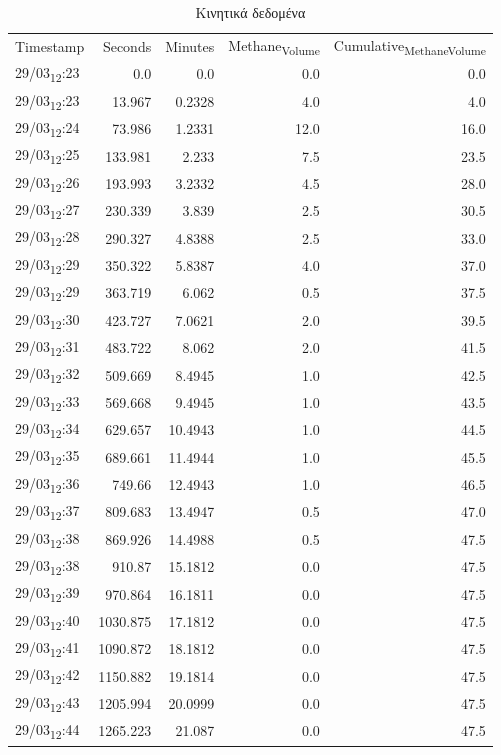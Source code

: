 \documentclass[11pt]{article}
\begin{document}
\begin{table}[htbp]
\caption{Κινητικά δεδομένα}
\centering
\begin{tabular}{lrrrr}
Timestamp & Seconds & Minutes & Methane\textsubscript{Volume} & Cumulative\textsubscript{Methane}\textsubscript{Volume}\\[0pt]
29/03\textsubscript{12}:23 & 0.0 & 0.0 & 0.0 & 0.0\\[0pt]
29/03\textsubscript{12}:23 & 13.967 & 0.2328 & 4.0 & 4.0\\[0pt]
29/03\textsubscript{12}:24 & 73.986 & 1.2331 & 12.0 & 16.0\\[0pt]
29/03\textsubscript{12}:25 & 133.981 & 2.233 & 7.5 & 23.5\\[0pt]
29/03\textsubscript{12}:26 & 193.993 & 3.2332 & 4.5 & 28.0\\[0pt]
29/03\textsubscript{12}:27 & 230.339 & 3.839 & 2.5 & 30.5\\[0pt]
29/03\textsubscript{12}:28 & 290.327 & 4.8388 & 2.5 & 33.0\\[0pt]
29/03\textsubscript{12}:29 & 350.322 & 5.8387 & 4.0 & 37.0\\[0pt]
29/03\textsubscript{12}:29 & 363.719 & 6.062 & 0.5 & 37.5\\[0pt]
29/03\textsubscript{12}:30 & 423.727 & 7.0621 & 2.0 & 39.5\\[0pt]
29/03\textsubscript{12}:31 & 483.722 & 8.062 & 2.0 & 41.5\\[0pt]
29/03\textsubscript{12}:32 & 509.669 & 8.4945 & 1.0 & 42.5\\[0pt]
29/03\textsubscript{12}:33 & 569.668 & 9.4945 & 1.0 & 43.5\\[0pt]
29/03\textsubscript{12}:34 & 629.657 & 10.4943 & 1.0 & 44.5\\[0pt]
29/03\textsubscript{12}:35 & 689.661 & 11.4944 & 1.0 & 45.5\\[0pt]
29/03\textsubscript{12}:36 & 749.66 & 12.4943 & 1.0 & 46.5\\[0pt]
29/03\textsubscript{12}:37 & 809.683 & 13.4947 & 0.5 & 47.0\\[0pt]
29/03\textsubscript{12}:38 & 869.926 & 14.4988 & 0.5 & 47.5\\[0pt]
29/03\textsubscript{12}:38 & 910.87 & 15.1812 & 0.0 & 47.5\\[0pt]
29/03\textsubscript{12}:39 & 970.864 & 16.1811 & 0.0 & 47.5\\[0pt]
29/03\textsubscript{12}:40 & 1030.875 & 17.1812 & 0.0 & 47.5\\[0pt]
29/03\textsubscript{12}:41 & 1090.872 & 18.1812 & 0.0 & 47.5\\[0pt]
29/03\textsubscript{12}:42 & 1150.882 & 19.1814 & 0.0 & 47.5\\[0pt]
29/03\textsubscript{12}:43 & 1205.994 & 20.0999 & 0.0 & 47.5\\[0pt]
29/03\textsubscript{12}:44 & 1265.223 & 21.087 & 0.0 & 47.5\\[0pt]
\end{tabular}
\end{table}
\end{document}
